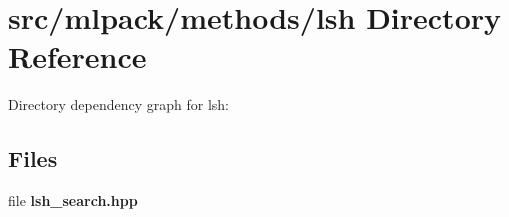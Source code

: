 \section{src/mlpack/methods/lsh Directory Reference}
\label{dir_d88436220624cec31005e994cbbd4f17}
Directory dependency graph for lsh\-:
\subsection*{Files}
\begin{DoxyCompactItemize}
\item 
file {\bf lsh\-\_\-search.\-hpp}
\end{DoxyCompactItemize}
